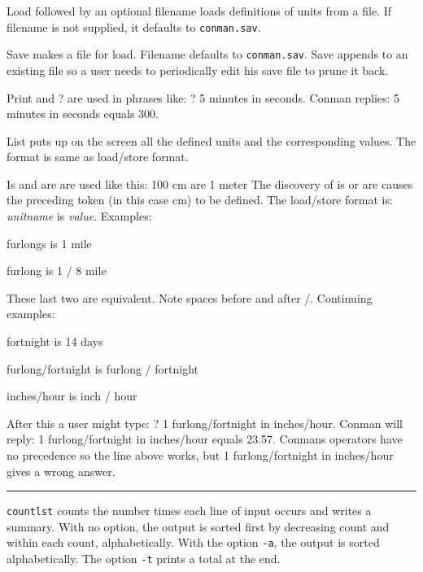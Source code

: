 {{\textquotedbl}Load{\textquotedbl} followed by an optional filename
loads definitions of units from a file. If filename is not supplied, it
defaults to \texttt{conman.sav}.

{\textquotedbl}Save{\textquotedbl} makes a file for
{\textquotedbl}load{\textquotedbl}. Filename defaults to
\texttt{conman.sav}. {\textquotedbl}Save{\textquotedbl} appends to an
existing file so a user needs to periodically edit his save file to
prune it back.

{\textquotedbl}Print{\textquotedbl} and {\textquotedbl}?{\textquotedbl}
are used in phrases like: ? 5 minutes in seconds. Conman replies: 5
minutes in seconds equals 300.

List puts up on the screen all the defined units and the corresponding
values. The format is same as load/store format.

{\textquotedbl}Is{\textquotedbl} and {\textquotedbl}are{\textquotedbl}
are used like this: 100 cm are 1 meter The discovery of is or are
causes the preceding token (in this case
{\textquotedbl}cm{\textquotedbl}) to be defined. The load/store format
is: \textit{unitname} {\textquotedbl}is{\textquotedbl} \textit{value}.
Examples:

{ furlongs is 1 mile}

{\sffamily
furlong is 1 / 8 mile }

These last two are equivalent. Note spaces before and after
{\textquotedbl}/{\textquotedbl}. Continuing examples:

{ fortnight is 14 days }

{\sffamily
furlong/fortnight is furlong / fortnight}

{\sffamily
inches/hour is inch / hour }

After this a user might type: ? 1 furlong/fortnight in inches/hour.
Conman will reply: 1 furlong/fortnight in inches/hour equals 23.57.
Conman{\textquotesingle}s operators have no precedence so the line
above works, but 1 furlong/fortnight in inches/hour gives a wrong
answer. 

\vspace{0.25cm}\hrule{}

\texttt{countlst} counts the number times each line of input occurs and
writes a summary. With no option, the output is sorted first by
decreasing count and within each count, alphabetically. With the option
\texttt{{}-a}, the output is sorted alphabetically. The option
\texttt{{}-t} prints a total at the end.

}
